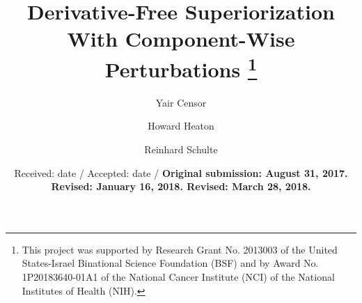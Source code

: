 \documentclass[smallextended]{svjour3}      %
\begin{document}
\title{Derivative-Free Superiorization With Component-Wise Perturbations
	\thanks{This project was supported by Research Grant No. 2013003 of the United 	States-Israel Binational Science Foundation (BSF) and by Award No. 	1P20183640-01A1 of the National Cancer Institute (NCI) of the National 	Institutes of Health (NIH).}
}



\author{Yair Censor \and Howard Heaton \and Reinhard Schulte}


\date{Received: date / Accepted: date /
\textbf{Original submission: August 31, 2017. Revised: January 16, 2018. Revised: March 28, 2018.}}

\maketitle
\end{document}
